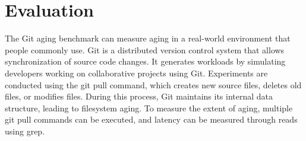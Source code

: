 \section{Evaluation}
\label{s:eval}




The Git aging benchmark\cite{conway:login17,senescence:fast17} can measure aging in a real-world environment that people commonly use.
Git is a distributed version control system that allows synchronization of source code changes.
It generates workloads by simulating developers working on collaborative projects using Git.
Experiments are conducted using the git pull command, which creates new source files, deletes old files, or modifies files. During this process, Git maintains its internal data structure, leading to filesystem aging.
To measure the extent of aging, multiple git pull commands can be executed, and latency can be measured through reads using grep.

